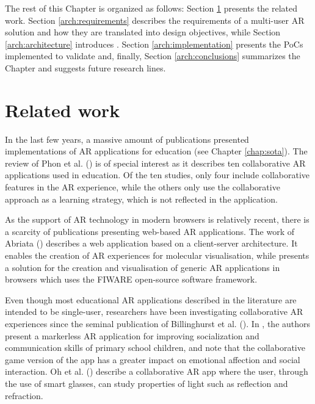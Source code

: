 The rest of this Chapter is organized as follows: Section \ref{arch:related} presents the related work. Section \ref{arch:requirements} describes the requirements of a multi-user AR solution and how they are translated into design objectives, while Section \ref{arch:architecture} introduces \arch{}. Section \ref{arch:implementation} presents the PoCs implemented to validate \arch{} and, finally, Section \ref{arch:conclusions} summarizes the Chapter and suggests future research lines.


\section{Related work}\label{arch:related}

In the last few years, a massive amount of publications presented implementations of AR applications for education (see Chapter \ref{chap:sota}). The review of Phon et al. (\citeyear{6821833}) is of special interest as it describes ten collaborative AR applications used in education. Of the ten studies, only four include collaborative features in the AR experience, while the others only use the collaborative approach as a learning strategy, which is not reflected in the application.

As the support of AR technology in modern browsers is relatively recent, there is a scarcity of publications presenting web-based AR applications. 
The work of Abriata (\citeyear{abriata2020building}) describes a web application based on a client-server architecture. It enables the creation of AR experiences for molecular visualisation, while \citep{coma2019fi} presents a solution for the creation and visualisation of generic AR applications in browsers which uses the FIWARE open-source software framework.

Even though most educational AR applications described in the literature are intended to be single-user, researchers have been investigating collaborative AR experiences since the seminal publication of Billinghurst et al. (\citeyear{billinghurst2002collaborative}). In \cite{lopez2020emofindar}, the authors present a markerless AR application for improving socialization and communication skills of primary school children, and note that the collaborative game version of the app has a greater impact on emotional affection and social interaction. Oh et al. (\citeyear{oh2017hybrid}) describe a collaborative AR app where the user, through the use of smart glasses, can study properties of light such as reflection and refraction.

